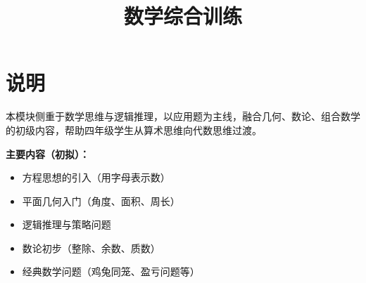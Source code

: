 \documentclass[a4paper,12pt]{ctexart}
\title{\textcolor{blue!70!black}{\Huge\textbf{数学综合训练}}}
\author{}
\date{}
\begin{document}
\maketitle
\thispagestyle{empty}

\section*{\textcolor{blue!70!black}{说明}}

本模块侧重于数学思维与逻辑推理，以应用题为主线，融合几何、数论、组合数学的初级内容，帮助四年级学生从算术思维向代数思维过渡。

\textbf{主要内容（初拟）：}
\begin{itemize}
  \item 方程思想的引入（用字母表示数）
  \item 平面几何入门（角度、面积、周长）
  \item 逻辑推理与策略问题
  \item 数论初步（整除、余数、质数）
  \item 经典数学问题（鸡兔同笼、盈亏问题等）
\end{itemize}
\end{document}
